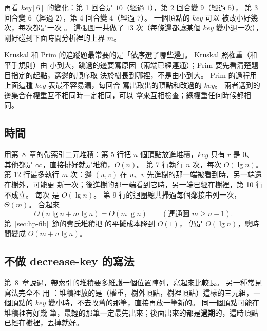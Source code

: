 再看 $\mathit{key}[6]$ 的變化：第 1 回合是 $10$（經過 $1$），第 2 回合變 $9$（經過 $5$），
第 3 回合變 $6$（經過 $2$），第 4 回合變 $4$（經過 $7$）。 一個頂點的 $\mathit{key}$ 可以
被改小好幾次，每次都是一次 。 這張圖一共做了 $13$ 次（每條邊都讓某個
$\mathit{key}$ 變小過一次），剛好碰到下面時間分析裡的上界 $m$。

\begin{examnote}
Kruskal 和 Prim 的追蹤題最常要的是「依序選了哪些邊」。 Kruskal 照權重（和平手規則）由
小到大，跳過的邊要寫原因（兩端已經連通）；Prim 要先看清楚題目指定的起點，選邊的順序取
決於樹長到哪裡，不是由小到大。 Prim 的過程用上面這種 $\mathit{key}$ 表最不容易漏，每回合
寫出取出的頂點和改過的 $\mathit{key}$。 兩者選到的邊集合在權重互不相同時一定相同，可以
拿來互相檢查；總權重任何時候都相同。
\end{examnote}

\subsection{時間}

用第~8~章的帶索引二元堆積：第 5 行把 $n$ 個頂點放進堆積，$\mathit{key}$ 只有 $r$ 是 $0$、
其他都是 $\infty$，直接排好就是堆積，$O(n)$。 第 7 行執行 $n$ 次，每次 $O(\lg n)$。 第 12
行最多執行 $m$ 次：邊 $(u, v)$ 在 $u$、$v$ 先進樹的那一端被看到時，另一端還在樹外，可能更
新一次；後進樹的那一端看到它時，另一端已經在樹裡，第 10 行不成立。 每次
 是 $O(\lg n)$。 第 9 行的迴圈總共掃過每個鄰接串列一次，$\Theta(m)$。
合起來
\[
O(n \lg n + m \lg n) = O(m \lg n) \qquad (\text{連通圖 } m \ge n - 1).
\]
第~\ref{sec:hp-fib}~節的費氏堆積把  的平攤成本降到 $O(1)$，
 仍是 $O(\lg n)$，總時間變成 $O(m + n \lg n)$。

\subsection{不做 decrease-key 的寫法}

第~8~章說過，帶索引的堆積要多維護一個位置陣列，寫起來比較長。 另一種常見寫法完全不
用 ：堆積裡放的是（權重，樹外頂點，樹裡頂點）這樣的三元組，一個頂點的
$\mathit{key}$ 變小時，不去改舊的那筆，直接再放一筆新的。 同一個頂點可能在堆積裡有好幾
筆，最輕的那筆一定最先出來；後面出來的都是\textbf{過期}的，這時頂點已經在樹裡，丟掉就好。


